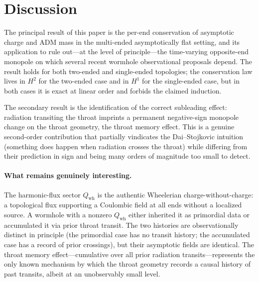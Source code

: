 \documentclass[aps,prd,onecolumn,nofootinbib,superscriptaddress]{revtex4-2}
\begin{document}
\section{Discussion}
\label{sec:discussion}

The principal result of this paper is the per-end conservation of asymptotic
charge and ADM mass in the multi-ended asymptotically flat setting, and its
application to rule out---at the level of principle---the time-varying
opposite-end monopole on which several recent wormhole observational proposals
depend.  The result holds for both two-ended and single-ended topologies; the
conservation law lives in $H^2$ for the two-ended case and in $H^1$ for the
single-ended case, but in both cases it is exact at linear order and forbids
the claimed induction.

The secondary result is the identification of the correct subleading effect:
radiation transiting the throat imprints a permanent negative-sign monopole
change on the throat geometry, the throat memory effect.  This is a genuine
second-order contribution that partially vindicates the Dai--Stojkovic
intuition (something does happen when radiation crosses the throat) while
differing from their prediction in sign and being many orders of magnitude too
small to detect.

\paragraph{What remains genuinely interesting.}
The harmonic-flux sector $Q_{\mathrm{wh}}$ is the authentic Wheelerian
charge-without-charge: a topological flux supporting a Coulombic field at all
ends without a localized source.  A wormhole with a nonzero $Q_{\mathrm{wh}}$
either inherited it as primordial data or accumulated it via prior throat
transit.  The two histories are observationally distinct in principle (the
primordial case has no transit history; the accumulated case has a record of
prior crossings), but their asymptotic fields are identical.  The throat memory
effect---cumulative over all prior radiation transits---represents the only
known mechanism by which the throat geometry records a causal history of past
transits, albeit at an unobservably small level.
\end{document}
